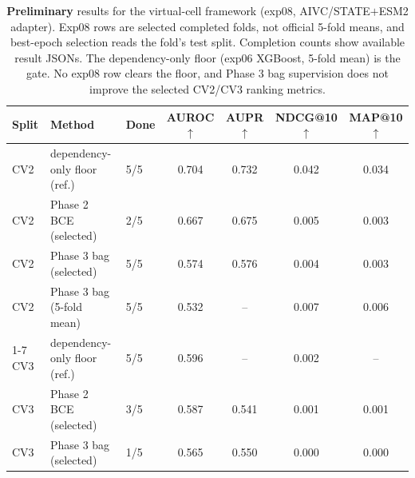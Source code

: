 \begin{table}[!htbp]
  \centering
  \caption{\textbf{Preliminary} results for the virtual-cell framework (exp08,
  AIVC/STATE${+}$ESM2 adapter). Exp08 rows are selected completed folds, not
  official 5-fold means, and best-epoch selection reads the fold's test split.
  Completion counts show available result JSONs. The dependency-only floor
  (exp06 XGBoost, 5-fold mean) is the gate. No exp08 row clears the floor, and
  Phase 3 bag supervision does not improve the selected CV2/CV3 ranking metrics.}
  \label{tab:method}
  \setlength{\tabcolsep}{4pt}
  \begin{tabular}{lllcccc}
    \toprule
    Split & Method & Done & AUROC$\uparrow$ & AUPR$\uparrow$ & NDCG@10$\uparrow$ & MAP@10$\uparrow$ \\
    \midrule
    CV2 & dependency-only floor (ref.) & 5/5 & 0.704 & 0.732 & 0.042 & 0.034 \\
    CV2 & Phase 2 BCE (selected) & 2/5 & 0.667 & 0.675 & 0.005 & 0.003 \\
    CV2 & Phase 3 bag (selected) & 5/5 & 0.574 & 0.576 & 0.004 & 0.003 \\
    CV2 & Phase 3 bag (5-fold mean) & 5/5 & 0.532 & -- & 0.007 & 0.006 \\
    \cmidrule(lr){1-7}
    CV3 & dependency-only floor (ref.) & 5/5 & 0.596 & -- & 0.002 & -- \\
    CV3 & Phase 2 BCE (selected) & 3/5 & 0.587 & 0.541 & 0.001 & 0.001 \\
    CV3 & Phase 3 bag (selected) & 1/5 & 0.565 & 0.550 & 0.000 & 0.000 \\
    \bottomrule
  \end{tabular}
\end{table}
